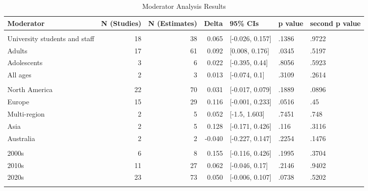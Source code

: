 \documentclass[sn-nature,referee,pdflatex]{sn-jnl}
\begin{document}
\begin{table}

\caption{\label{tab:table_two}Moderator Analysis Results}
\centering
\begin{tabular}[t]{lrrrlll}
\toprule
Moderator & N (Studies) & N (Estimates) & Delta & 95\% CIs & p value & second p value\\
\midrule
\addlinespace[0.5em]
\multicolumn{7}{l}{\textbf{Population}}\\
\hspace{1em}University students and staff & 18 & 38 & 0.065 & {}[-0.026, 0.157] & .1386 & .9722\\
\hspace{1em}Adults & 17 & 61 & 0.092 & {}[0.008, 0.176] & .0345 & .5197\\
\hspace{1em}Adolescents & 3 & 6 & 0.022 & {}[-0.395, 0.44] & .8056 & .5923\\
\hspace{1em}All ages & 2 & 3 & 0.013 & {}[-0.074, 0.1] & .3109 & .2614\\
\addlinespace[0.5em]
\multicolumn{7}{l}{\textbf{Region}}\\
\hspace{1em}North America & 22 & 70 & 0.031 & {}[-0.017, 0.079] & .1889 & .0896\\
\hspace{1em}Europe & 15 & 29 & 0.116 & {}[-0.001, 0.233] & .0516 & .45\\
\hspace{1em}Multi-region & 2 & 5 & 0.052 & {}[-1.5, 1.603] & .7451 & .748\\
\hspace{1em}Asia & 2 & 5 & 0.128 & {}[-0.171, 0.426] & .116 & .3116\\
\hspace{1em}Australia & 2 & 2 & -0.040 & {}[-0.227, 0.147] & .2254 & .1476\\
\addlinespace[0.5em]
\multicolumn{7}{l}{\textbf{Publication Decade}}\\
\hspace{1em}2000s & 6 & 8 & 0.155 & {}[-0.116, 0.426] & .1995 & .3704\\
\hspace{1em}2010s & 11 & 27 & 0.062 & {}[-0.046, 0.17] & .2146 & .9402\\
\hspace{1em}2020s & 23 & 73 & 0.050 & {}[-0.006, 0.107] & .0738 & .5202\\
\addlinespace[0.5em]
\multicolumn{7}{l}{\textbf{Delivery Methods}}\\

\end{tabular}
\end{table}
\end{document}
